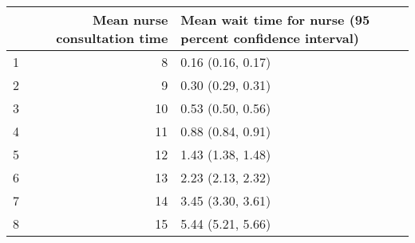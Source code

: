 \begin{table}[ht]
\centering
\begin{tabular}{rrl}
  \hline
 & Mean nurse consultation time & Mean wait time for nurse (95 percent confidence interval) \\ 
  \hline
1 &   8 & 0.16 (0.16, 0.17) \\ 
  2 &   9 & 0.30 (0.29, 0.31) \\ 
  3 &  10 & 0.53 (0.50, 0.56) \\ 
  4 &  11 & 0.88 (0.84, 0.91) \\ 
  5 &  12 & 1.43 (1.38, 1.48) \\ 
  6 &  13 & 2.23 (2.13, 2.32) \\ 
  7 &  14 & 3.45 (3.30, 3.61) \\ 
  8 &  15 & 5.44 (5.21, 5.66) \\ 
   \hline
\end{tabular}
\end{table}
